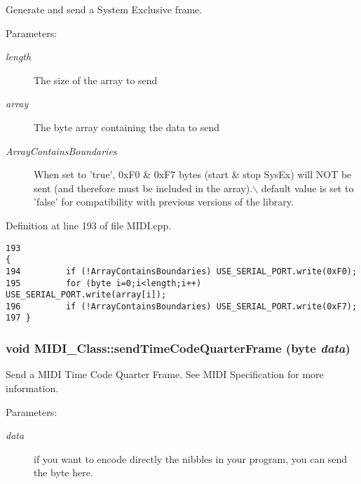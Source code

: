 Generate and send a System Exclusive frame. \begin{Desc}
\item[Parameters:]
\begin{description}
\item[{\em length}]The size of the array to send \item[{\em array}]The byte array containing the data to send \item[{\em ArrayContainsBoundaries}]When set to 'true', 0xF0 \& 0xF7 bytes (start \& stop SysEx) will NOT be sent (and therefore must be included in the array).$\backslash$ default value is set to 'false' for compatibility with previous versions of the library. \end{description}
\end{Desc}


Definition at line 193 of file MIDI.cpp.

\begin{Code}\begin{verbatim}193                                                                                   {
194         if (!ArrayContainsBoundaries) USE_SERIAL_PORT.write(0xF0);
195         for (byte i=0;i<length;i++) USE_SERIAL_PORT.write(array[i]);
196         if (!ArrayContainsBoundaries) USE_SERIAL_PORT.write(0xF7);
197 }
\end{verbatim}
\end{Code}


\hypertarget{class_m_i_d_i___class_1f720df72c5253d85d1d547d09357ea0}{
\subsubsection[{sendTimeCodeQuarterFrame}]{\setlength{\rightskip}{0pt plus 5cm}void MIDI\_\-Class::sendTimeCodeQuarterFrame ({\bf byte} {\em data})}}
\label{class_m_i_d_i___class_1f720df72c5253d85d1d547d09357ea0}


Send a MIDI Time Code Quarter Frame. See MIDI Specification for more information. \begin{Desc}
\item[Parameters:]
\begin{description}
\item[{\em data}]if you want to encode directly the nibbles in your program, you can send the byte here. \end{description}
\end{Desc}



